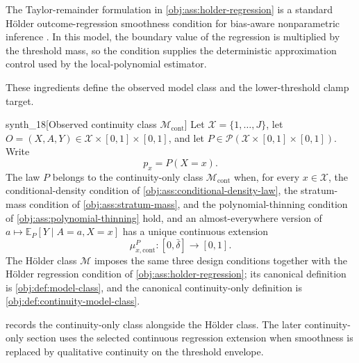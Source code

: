 \documentclass[11pt]{article}
\begin{document}
The Taylor-remainder formulation in \cref{obj:ass:holder-regression} is a standard Hölder outcome-regression smoothness condition for bias-aware nonparametric inference \citep{ArmstrongKolesar2020}. In this model, the boundary value of the regression  is multiplied by the threshold mass, so the condition supplies the deterministic approximation control used by the local-polynomial estimator.

These ingredients define the observed model class and the lower-threshold clamp target.

\begin{definitionv}{synth_18}[Observed continuity class $\mathcal M_{\mathrm{cont}}$]
Let \(\mathcal X=\{1,\ldots,J\}\), let \(O=(X,A,Y)\in\mathcal X\times[0,1]\times[0,1]\), and let \(P\in\mathcal P(\mathcal X\times[0,1]\times[0,1])\). Write
\[
p_x=P(X=x).
\]
The law \(P\) belongs to the continuity-only class \(\mathcal M_{\mathrm{cont}}\) when, for every \(x\in\mathcal X\), the conditional-density condition of \cref{obj:ass:conditional-density-law}, the stratum-mass condition of \cref{obj:ass:stratum-mass}, and the polynomial-thinning condition of \cref{obj:ass:polynomial-thinning} hold, and an almost-everywhere version of \(a\mapsto\mathbb E_P[Y\mid A=a,X=x]\) has a unique continuous extension
\[
\mu_{x,\mathrm{cont}}^P:[0,\bar\delta]\to[0,1].
\]
The Hölder class \(\mathcal M\) imposes the same three design conditions together with the Hölder regression condition of \cref{obj:ass:holder-regression}; its canonical definition is \cref{obj:def:model-class}, and the canonical continuity-only definition is \cref{obj:def:continuity-model-class}.
\end{definitionv}

 records the continuity-only class  alongside the Hölder class. The later continuity-only section uses the selected continuous regression extension  when smoothness is replaced by qualitative continuity on the threshold envelope.
\end{document}
